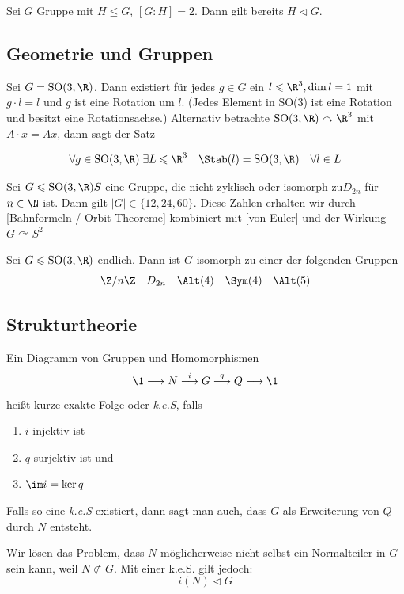 \documentclass[11pt, a4paper]{article}
\begin{document}
\begin{lemma} Sei $G$ Gruppe mit $H\leqslant G$, $[G:H]=2$. Dann gilt bereits $H\triangleleft G$.
\end{lemma}
\subsection{Geometrie und Gruppen}

\begin{theorem} Sei $G = \mathrm{SO}(3,\R)$. Dann existiert für jedes $g\in G$ ein $l\leqslant \R^3, \dim l = 1$ mit $g\cdot l = l$ und $g$ ist eine Rotation um $l$. (Jedes Element in SO(3) ist eine Rotation und besitzt eine Rotationsachse.) Alternativ betrachte $\mathrm{SO}(3,\R)\curvearrowright \R^3$ mit $A\cdot x = Ax$, dann sagt der Satz

$$\forall g\in \mathrm{SO}(3,\R)\; \exists L\leqslant \R^3 \quad \Stab(l) = \mathrm{SO}(3,\R) \quad \forall l\in L$$
    
\end{theorem}

\begin{lemma}
    Sei $G\leqslant \mathrm{SO}(3,\R)S$ eine Gruppe, die nicht zyklisch oder isomorph zu$D_{2n}$ für $n\in \N$ ist. Dann gilt $|G|\in \{12, 24, 60\}$. Diese Zahlen erhalten wir durch \ref{Bahnformeln / Orbit-Theoreme} kombiniert mit \ref{von Euler} und der Wirkung $G\curvearrowright S^2$
\end{lemma}


\begin{theorem}
    Sei $G\leqslant \mathrm{SO}(3,\R)$ endlich. Dann ist $G$ isomorph zu einer der folgenden Gruppen
    $$\Z/n\Z \quad D_{2n}\quad \Alt(4) \quad \Sym(4) \quad \Alt(5)$$
\end{theorem}

\subsection{Strukturtheorie}

\begin{definition}
Ein Diagramm von Gruppen und Homomorphismen
$$\1 \longrightarrow N \overset{i}{\longrightarrow} G \overset{q}{\longrightarrow} Q\longrightarrow \1 $$
heißt kurze exakte Folge oder \emph{k.e.S}, falls
\begin{enumerate}[label = (\roman*)]
    \item $i$ injektiv ist
    \item $q$ surjektiv ist und
    \item $\im i = \ker q$
\end{enumerate}
Falls so eine \emph{k.e.S} existiert, dann sagt man auch, dass $G$ als Erweiterung von $Q$ durch $N$ entsteht.
\end{definition}
\begin{note} Wir lösen das Problem, dass $N$ möglicherweise nicht selbst ein Normalteiler in $G$ sein kann, weil $N \not\subset G$. Mit einer k.e.S. gilt jedoch:
$$i(N) \triangleleft G$$
\end{note}
\end{document}
